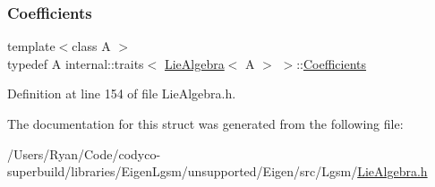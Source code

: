 \subsubsection{\texorpdfstring{Coefficients}{Coefficients}}
{\footnotesize\ttfamily template$<$class A $>$ \\
typedef A internal\+::traits$<$ \hyperlink{class_lie_algebra}{Lie\+Algebra}$<$ A $>$ $>$\+::\hyperlink{structinternal_1_1traits_3_01_lie_algebra_3_01_a_01_4_01_4_a001bd1e57bb80cc75d486c92b152d2f2}{Coefficients}}



Definition at line 154 of file Lie\+Algebra.\+h.



The documentation for this struct was generated from the following file\+:\begin{DoxyCompactItemize}
\item 
/\+Users/\+Ryan/\+Code/codyco-\/superbuild/libraries/\+Eigen\+Lgsm/unsupported/\+Eigen/src/\+Lgsm/\hyperlink{_lie_algebra_8h}{Lie\+Algebra.\+h}\end{DoxyCompactItemize}
